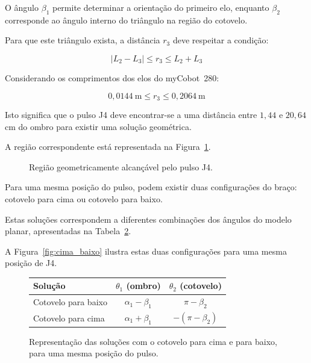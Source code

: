 O ângulo $\beta_1$ permite determinar a orientação do primeiro elo, enquanto $\beta_2$ corresponde ao ângulo interno do triângulo na região do cotovelo.

Para que este triângulo exista, a distância $r_3$ deve respeitar a condição:

\begin{equation}
    |L_2-L_3|\leq r_3\leq L_2+L_3
\end{equation}

Considerando os comprimentos dos elos do myCobot~280:

\begin{equation}
    0{,}0144\ \text{m}
    \leq r_3\leq
    0{,}2064\ \text{m}
\end{equation}

Isto significa que o pulso J4 deve encontrar-se a uma distância entre $1{,}44$ e $20{,}64$ cm do ombro para existir uma solução geométrica.

A região correspondente está representada na Figura~\ref{fig:alcance_pulso}.

\begin{figure}[H]
    \centering
    \resizebox{0.5\textwidth}{!}{
        
    }
    \caption{Região geometricamente alcançável pelo pulso J4.}
    \label{fig:alcance_pulso}
\end{figure}

Para uma mesma posição do pulso, podem existir duas configurações do braço: cotovelo para cima ou cotovelo para baixo.

Estas soluções correspondem a diferentes combinações dos ângulos do modelo planar, apresentadas na Tabela~\ref{tab:ik_solucoes}.

A Figura~\ref{fig:cima_baixo} ilustra estas duas configurações para uma mesma posição de J4.
\begin{figure}[H]
    \centering
    \begin{minipage}[c]{0.48\textwidth}
        \centering
        \resizebox{\linewidth}{!}{}
        \caption{Representação das soluções com o cotovelo para cima e para baixo, para uma mesma posição do pulso.}
        \label{fig:cima_baixo}
    \end{minipage}\hfill
    \begin{minipage}[c]{0.48\textwidth}
        \centering
        \label{tab:ik_solucoes}
        \begin{tabular}{lcc}
            \hline
            Solução & $\theta_1$ (ombro) & $\theta_2$ (cotovelo) \\
            \hline
            Cotovelo para baixo & $\alpha_1-\beta_1$ & $\pi-\beta_2$ \\
            Cotovelo para cima  & $\alpha_1+\beta_1$ & $-(\pi-\beta_2)$ \\
            \hline
        \end{tabular}
    \end{minipage}
\end{figure}

